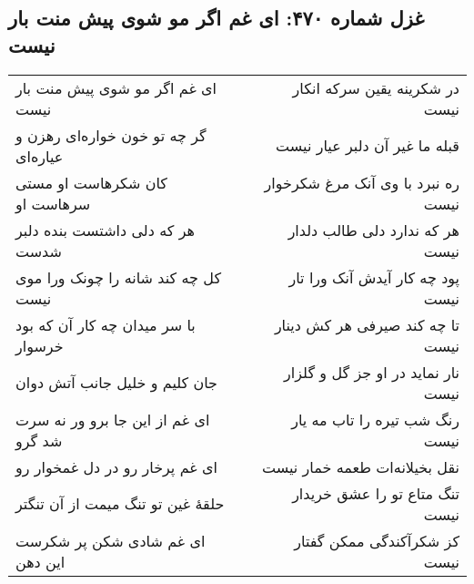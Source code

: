 \begin{center}
\section*{غزل شماره ۴۷۰: ای غم اگر مو شوی پیش منت بار نیست}
\label{sec:0470}
\begin{longtable}{l p{0.5cm} r}
ای غم اگر مو شوی پیش منت بار نیست
&&
در شکرینه یقین سرکه انکار نیست
\\
گر چه تو خون خواره‌ای رهزن و عیاره‌ای
&&
قبله ما غیر آن دلبر عیار نیست
\\
کان شکرهاست او مستی سرهاست او
&&
ره نبرد با وی آنک مرغ شکرخوار نیست
\\
هر که دلی داشتست بنده دلبر شدست
&&
هر که ندارد دلی طالب دلدار نیست
\\
کل چه کند شانه را چونک ورا موی نیست
&&
پود چه کار آیدش آنک ورا تار نیست
\\
با سر میدان چه کار آن که بود خرسوار
&&
تا چه کند صیرفی هر کش دینار نیست
\\
جان کلیم و خلیل جانب آتش دوان
&&
نار نماید در او جز گل و گلزار نیست
\\
ای غم از این جا برو ور نه سرت شد گرو
&&
رنگ شب تیره را تاب مه یار نیست
\\
ای غم پرخار رو در دل غمخوار رو
&&
نقل بخیلانه‌ات طعمه خمار نیست
\\
حلقهٔ غین تو تنگ میمت از آن تنگتر
&&
تنگ متاع تو را عشق خریدار نیست
\\
ای غم شادی شکن پر شکرست این دهن
&&
کز شکرآکندگی ممکن گفتار نیست
\\
\end{longtable}
\end{center}
